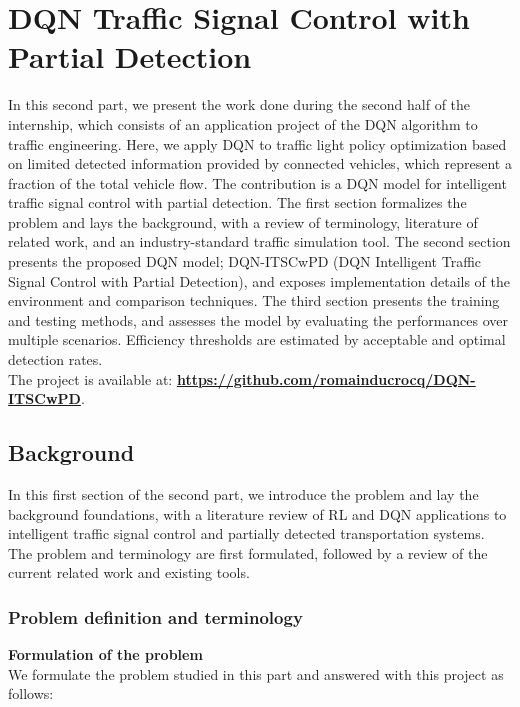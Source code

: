 \section{DQN Traffic Signal Control with Partial Detection}

In this second part, we present the work done during the second half of the internship, which consists of an application project of the DQN algorithm to traffic engineering. Here, we apply DQN to traffic light policy optimization based on limited detected information provided by connected vehicles, which represent a fraction of the total vehicle flow. The contribution is a DQN model for intelligent traffic signal control with partial detection.
The first section formalizes the problem and lays the background, with a review of terminology, literature of related work, and an industry-standard traffic simulation tool. The second section presents the proposed DQN model; DQN-ITSCwPD (DQN Intelligent Traffic Signal Control with Partial Detection), and exposes implementation details of the environment and comparison techniques. The third section presents the training and testing methods, and assesses the model by evaluating the performances over multiple scenarios. Efficiency thresholds are estimated by acceptable and optimal detection rates. \\
The project is available at: \textbf{\url{https://github.com/romainducrocq/DQN-ITSCwPD}}.

\subsection{Background}

In this first section of the second part, we introduce the problem and lay the background foundations, with a literature review of RL and DQN applications to intelligent traffic signal control and partially detected transportation systems. The problem and terminology are first formulated, followed by a review of the current related work and existing tools.

\subsubsection{Problem definition and terminology}

\textbf{Formulation of the problem} \\
We formulate the problem studied in this part and answered with this project as follows: 

